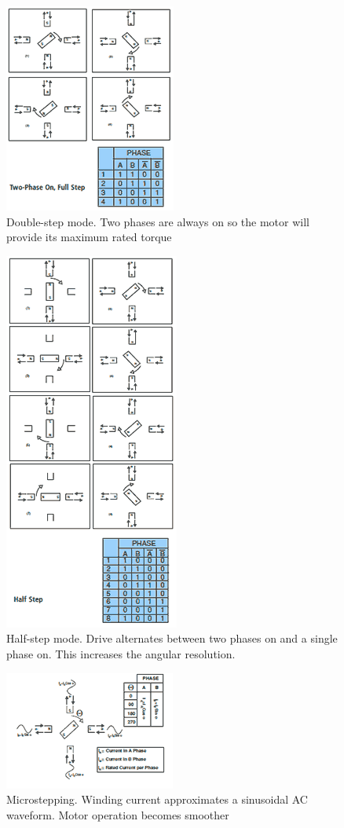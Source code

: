 \documentclass{instructions}
\begin{document}
\begin{figure}[h!]
    \centering
    \includegraphics[width=0.4\linewidth]{figs/doublestep.png}
    \caption{Double-step mode. Two phases are always on so the motor will
  provide its maximum rated torque}
    \label{doublestep}
\end{figure}


\begin{figure}[h!]
    \centering
    \includegraphics[width=0.4\linewidth]{figs/halfstep.png}
    \caption{Half-step mode. Drive alternates between two phases on and a
single phase on. This increases the angular resolution.}
    \label{halfstep}
\end{figure}


\begin{figure}[h!]
    \centering
    \includegraphics[width=0.4\linewidth]{figs/microstep.png}
    \caption{Microstepping. Winding current approximates a sinusoidal AC
waveform. Motor operation becomes smoother}
    \label{microstep}
\end{figure}
\end{document}
